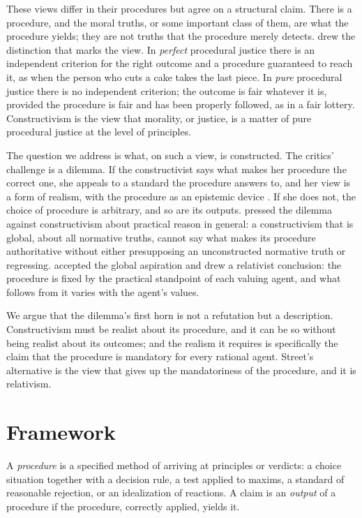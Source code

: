 \documentclass{situationist-preprint}
\begin{document}
These views differ in their procedures but agree on a structural claim. There is a procedure, and the moral truths, or some important class of them, are what the procedure yields; they are not truths that the procedure merely detects. \citet[\S14]{Rawls1971} drew the distinction that marks the view. In \emph{perfect} procedural justice there is an independent criterion for the right outcome and a procedure guaranteed to reach it, as when the person who cuts a cake takes the last piece. In \emph{pure} procedural justice there is no independent criterion; the outcome is fair whatever it is, provided the procedure is fair and has been properly followed, as in a fair lottery. Constructivism is the view that morality, or justice, is a matter of pure procedural justice at the level of principles.

The question we address is what, on such a view, is constructed. The critics' challenge is a dilemma. If the constructivist says what makes her procedure the correct one, she appeals to a standard the procedure answers to, and her view is a form of realism, with the procedure as an epistemic device \citep{ShaferLandau2003,HussainShah2006}. If she does not, the choice of procedure is arbitrary, and so are its outputs. \citet{Enoch2009} pressed the dilemma against constructivism about practical reason in general: a constructivism that is global, about all normative truths, cannot say what makes its procedure authoritative without either presupposing an unconstructed normative truth or regressing. \citet{Street2008,Street2010} accepted the global aspiration and drew a relativist conclusion: the procedure is fixed by the practical standpoint of each valuing agent, and what follows from it varies with the agent's values.

We argue that the dilemma's first horn is not a refutation but a description. Constructivism must be realist about its procedure, and it can be so without being realist about its outcomes; and the realism it requires is specifically the claim that the procedure is mandatory for every rational agent. Street's alternative is the view that gives up the mandatoriness of the procedure, and it is relativism.

\section{Framework}\label{s:framework}

\begin{definition}\label{d:procedure}
A \emph{procedure} is a specified method of arriving at principles or verdicts: a choice situation together with a decision rule, a test applied to maxims, a standard of reasonable rejection, or an idealization of reactions. A claim is an \emph{output} of a procedure if the procedure, correctly applied, yields it.
\end{definition}
\end{document}

